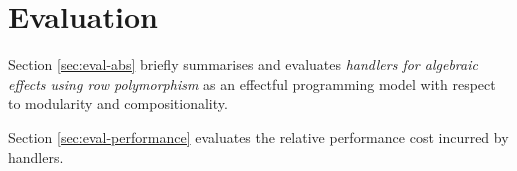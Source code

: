 \chapter{Evaluation}
Section \ref{sec:eval-abs} briefly summarises and evaluates \emph{handlers for algebraic effects using row polymorphism} as an effectful programming model with respect to modularity and compositionality.

Section \ref{sec:eval-performance} evaluates the relative performance cost incurred by handlers.